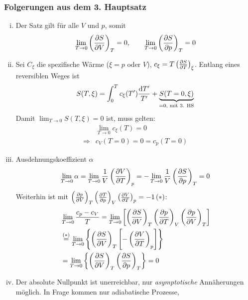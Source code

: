 \subsubsection{Folgerungen aus dem 3. Hauptsatz}
\begin{enumerate}[i)]
    \item Der Satz gilt für alle $V$ und $p$, somit
    \begin{equation}
        \lim_{T \to 0} \left( \frac{\partial S}{\partial V} \right)_{T} = 0, \qquad \lim_{T \to 0} \left( \frac{\partial S}{\partial p} \right)_{T} = 0
    \end{equation}
    \item Sei $C_\xi$ die spezifische Wärme ($\xi = p$ oder $V$), $c_\xi = T \left( \frac{\partial S}{\partial T} \right)_{\xi}$. Entlang eines reversiblen Weges ist
    \begin{equation}
        S(T, \xi) = \int_{0}^{T} c_\xi(T') \frac{\mathrm{d} T'}{T'} + \underbrace{S(T=0, \xi)}_{=0, \text{ mit 3. HS}}
    \end{equation}
    Damit $\lim_{T \to 0} S(T, \xi) = 0$ ist, muss gelten:
    \begin{equation}
        \begin{split}
            & \lim_{T \to 0} c_\xi(T) = 0 \\
            \Rightarrow & c_V (T=0) = 0 = c_p(T=0)
        \end{split}
    \end{equation}
    \item Ausdehnungskoeffizient $\alpha$
    \begin{equation}
        \lim_{T \to 0} \alpha = \lim_{T \to 0} \frac{1}{V} \left( \frac{\partial V}{\partial T} \right)_{p} = - \lim_{T \to 0} \frac{1}{V} \left( \frac{\partial S}{\partial p} \right)_{T} = 0
    \end{equation}
    Weiterhin ist mit $\left( \frac{\partial p}{\partial V} \right)_{T} \left( \frac{\partial T}{\partial p} \right)_{V} \left( \frac{\partial V}{\partial T} \right)_{p} = -1 \, (*)$:
    \begin{equation}
        \begin{split}
            & \lim_{T \to 0} \frac{c_p - c_V}{T} = \lim_{T \to 0} \left[ \left( \frac{\partial S}{\partial V} \right)_{T} \left( \frac{\partial p}{\partial T} \right)_{V} \left( \frac{\partial p}{\partial V} \right)_{T} \right] \\
            &\overset{(*)}{=} \lim_{T \to 0} \left\{ \left( \frac{\partial S}{\partial V} \right)_{T} \left[- \left( \frac{\partial V}{\partial T} \right)_{p} \right] \right\} \\
            &= \lim_{T \to 0} \left\{ \left( \frac{\partial S}{\partial V} \right)_{T} \left( \frac{\partial S}{\partial p} \right)_{T} \right\} = 0
        \end{split}
    \end{equation}
    \item Der absolute Nullpunkt ist unerreichbar, nur \emph{asymptotische} Annäherungen möglich. In Frage kommen nur adiabatische Prozesse,

\end{enumerate}
